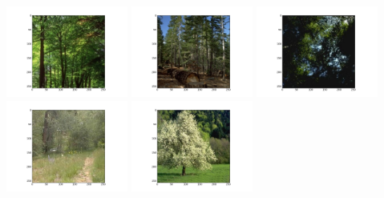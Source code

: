\includegraphics[width=4cm]{dbshow-6-0.png} 
\includegraphics[width=4cm]{dbshow-6-1.png} 
\includegraphics[width=4cm]{dbshow-6-2.png} 
\includegraphics[width=4cm]{dbshow-6-3.png} 
\includegraphics[width=4cm]{dbshow-6-4.png} 
